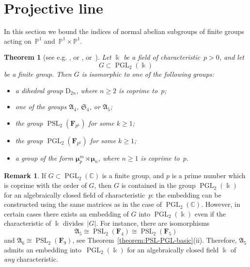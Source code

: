 \documentclass[12pt]{amsart}
\numberwithin{equation}{section}
\newtheorem{theorem}[subsection]{Theorem}
\theoremstyle{definition}
\newtheorem{remark}[subsection]{Remark}
\newcommand{\mumu}{\boldsymbol{\mu}}
\newcommand{\PP}{\mathbb P}
\newcommand{\DD}{\mathrm D}
\DeclareMathOperator{\PGL}{PGL}
\DeclareMathOperator{\PSL}{PSL}
\def \ge {\geqslant}
\begin{document}
\section{Projective line}
\label{section:P1}

In this section we bound the indices of normal abelian subgroups of finite
groups acting on~$\PP^1$ and~$\PP^1\times\PP^1$.

\begin{theorem}[{see e.g. \cite[Chapter~XII]{Dickson}, or \cite[Theorem~2.1]{King},
or~\mbox{\cite[Theorem~2.1]{DD}}}]
\label{theorem:ADE}
Let $\Bbbk$ be a field of characteristic~\mbox{$p>0$}, and let
$$
G\subset\PGL_2(\Bbbk)
$$
be a finite group.
Then $G$ is isomorphic to one of the following groups:
\begin{itemize}
\item[(1)] a dihedral group $\DD_{2n}$, where $n\ge 2$ is coprime to~$p$;

\item[(2)] one of the groups $\mathfrak{A}_4$, $\mathfrak{S}_4$, or
$\mathfrak{A}_5$;

\item[(3)] the group $\PSL_2(\mathbf{F}_{p^k})$ for some $k\ge 1$;

\item[(4)] the group $\PGL_2(\mathbf{F}_{p^k})$ for some $k\ge 1$;

\item[(5)] a group of the form $\mumu_p^m\rtimes \mumu_n$, where $n\ge 1$
is coprime to~$p$.
\end{itemize}
\end{theorem}

\begin{remark}
If $G\subset\PGL_2(\mathbb{C})$ is a finite group, and $p$ is a prime number which
is coprime with the order of $G$, then $G$ is contained in the group $\PGL_2(\Bbbk)$
for an algebraically closed field of characteristic~$p$: the embedding can be constructed using
the same matrices as in the case of $\PGL_2(\mathbb{C})$. However,
in certain cases there exists an embedding of $G$ into $\PGL_2(\Bbbk)$ even if the characteristic of $\Bbbk$ divides~$|G|$.
For instance, there are isomorphisms
$$
\mathfrak{A}_5\cong\PSL_2(\mathbf{F}_4)\cong \PSL_2(\mathbf{F}_5)
$$
and $\mathfrak{A}_6\cong\PSL_2(\mathbf{F}_9)$, see
Theorem~\ref{theorem:PSL-PGL-basic}(ii).
Therefore, $\mathfrak{A}_5$ admits an embedding into~\mbox{$\PGL_2(\Bbbk)$} for an algebraically closed field $\Bbbk$ of \emph{any} characteristic.
\end{remark}
\end{document}
